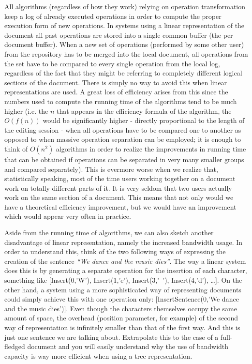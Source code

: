 All algorithms (regardless of how they work) relying on operation transformation keep
a log of already executed operations in order to compute the proper execution form of
new operations. In systems using a linear representation of the document all past
operations are stored into a single common buffer (the per document buffer). When a
new set of operations (performed by some other user) from the repository has to be
merged into the local document, all operations from the set have to be compared to every
single operation from the local log, regardless of the fact that they might be referring
to completely different logical sections of the document. There is simply no way to
avoid this when linear representations are used. A great loss of efficiency arises
from this since the numbers used to compute the running time of the algorithms tend
to be much higher (i.e. the $n$ that appears in the efficiency formula
of the algorithm, the $O(f(n))$ would be significantly higher - directly proportional
to the length of the editing session - when all operations have to be
compared one to another as opposed to when massive operation separation can be employed;
it is enough to think of $O(n^2)$ algorithms in order to realize the improvements in running
time that can be obtained if operations can be separated in very many smaller groups
and compared separately). This is evermore worse when we realize that,
statistically speaking, most of the time users working together on a document work
on totally different parts of it. It is very seldom that two users actually work
on the same section of a document. This means that not only would we have a theoretical
efficiency improvement, but we would have an improvement which would appear very
often in practice.

Aside from the running time of algorithms, we can also sketch another disadvantage of
linear representation, namely the increased bandwidth usage.
In order to understand this, think of the two following ways of expressing the creation
of the sentence \emph{``We dance and the music dies''}. The way a linear system does
this is by generating a separate operation for the insertion of each character, something
like [Insert(0,'W'), Insert(1,'e'), Insert(3,'\verb*+ +'), Insert(4,'d'), \ldots].
On the other hand, a system using a more sophisticated way of representing documents
could simply achieve this with one operation only: [InsertSentence(0,'We dance and the
music dies')]. Even though the characters themselves occupy the same amount of space,
the overhead (position parameter, for example) of the second way of representation
is infinitely smaller than that of the first way. And this is just one sentence we
are talking about. Extrapolate this to the case of a full-fledged document and you
will easily understand why the use of bandwidth capacity is way more efficient when using
a tree representation.

